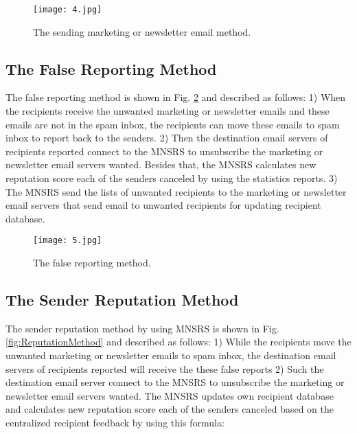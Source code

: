 \documentclass[conference]{IEEEtran}
\begin{document}
\begin{figure}
\centering
\texttt{[image: 4.jpg]}
\caption{The sending marketing or newsletter email method.} 
\label{fig:SendingMethod}
\end{figure}

\subsection{The False Reporting Method}
The false reporting method is
shown in Fig. \ref{fig:FaultReportingMethod} and described as follows:
1) When the recipients receive the unwanted marketing or newsletter emails and these emails are not in the spam inbox, the recipients can move these emails to spam inbox to report back to the senders.
2) Then the destination email servers of recipients reported connect to the MNSRS to unsubscribe the marketing or newsletter email servers wanted.
%
Besides that, the MNSRS calculates new reputation score each of the senders canceled by using the statistics reports.
3) The MNSRS send the lists of unwanted recipients to the marketing or newsletter email servers that send email to unwanted recipients for updating recipient database. 

\begin{figure}
\centering
\texttt{[image: 5.jpg]}
\caption{The false reporting method.}
\label{fig:FaultReportingMethod}
\end{figure}

\subsection{The Sender Reputation Method}
The sender reputation method by using MNSRS is
shown in Fig. \ref{fig:ReputationMethod} and described as follows:
1) While the recipients move the unwanted marketing or newsletter emails to spam inbox, the destination email servers of recipients reported will receive the these false reports
2) Such the destination email server connect to the MNSRS to unsubscribe the marketing or newsletter email servers wanted.
The MNSRS updates own recipient database and calculates new reputation score each of the senders canceled based on the centralized recipient feedback by using this formula:
\end{document}
